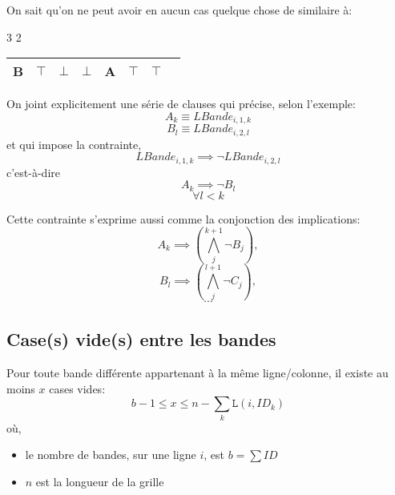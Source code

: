 \documentclass[a4paper,12pt]{report}
\newcommand\black{\cellcolor{black}}
\begin{document}
On sait qu'on ne peut avoir en aucun cas quelque chose de similaire à:

\begin{center}
3 2 
\begin{tabular}{|c|c|c|c|c|c|c|c|}
	\hline
	 \black \color{white}B  & \black \color{white}$\top$ 			
	& $\bot$ & 	$\bot$ &
	\black \color{white}A & \black \color{white}$\top$  & \black \color{white}$\top$  \\	
	\hline
\end{tabular}
\end{center}

On joint explicitement une série de clauses qui précise, selon l'exemple:\\ 
$$A_k \equiv LBande_{i,1,k}$$
$$B_l \equiv LBande_{i,2,l}$$
et qui impose la contrainte,
$$LBande_{i,1,k} \implies \lnot LBande_{i,2,l}$$
c'est-à-dire $$A_k \implies \lnot B_l$$
$$\forall l<k$$

Cette contrainte s'exprime aussi comme la conjonction des implications:
$$A_k \implies \left( \bigwedge_{j}^{k+1} \lnot B_j \right),$$
$$B_l \implies \left( \bigwedge_{j}^{l+1} \lnot C_j \right),$$
$$\cdots$$

\subsection{Case(s) vide(s) entre les bandes}

Pour toute bande différente appartenant à la même ligne/colonne, il existe au moins $x$ cases vides:\\
	$$b-1 \leq x \leq n - \sum_{k}\mathtt{L}(i,ID_k)$$
	où,
	\begin{itemize}
		\item[]le nombre de bandes, sur une ligne $i$, est $b=\sum ID$
		\item[]$n$ est la longueur de la grille\\
	\end{itemize}
\end{document}
